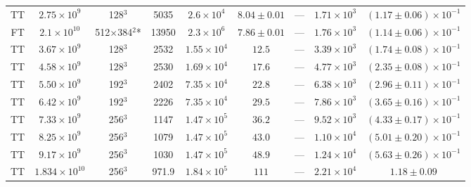 \documentclass[aps, pre, onecolumn, nofootinbib, notitlepage, groupedaddress, amsfonts, amssymb, amsmath, longbibliography, superscriptaddress]{revtex4-1}
\begin{document}
\begin{table}[ht]
\begin{center}
{\begin{tabular}{c c c c c c c c c}
TT	&	$2.75 \times 10^9$		&	128$^3$				&	5035		&	$2.6 \times 10^4$	&	$8.04 \pm 0.01$	&	---		&	$1.71 \times 10^3$  & $(1.17 \pm 0.06) \times 10^{-1}$ \\
FT	&	$2.1 \times 10^{10}$	&	512$\times$384$^2$*	&	13950		&	$2.3 \times 10^6$	&	$7.86 \pm 0.01$	&	---		&	$1.76 \times 10^3$  & $(1.14 \pm 0.06) \times 10^{-1}$ \\
TT	&	$3.67 \times 10^9$		&	128$^3$				&	2532		&	$1.55 \times 10^4$	&	$12.5$			&	---		&	$3.39 \times 10^3$  & $(1.74 \pm 0.08) \times 10^{-1}$ \\
TT	&	$4.58 \times 10^9$		&	128$^3$				&	2530		&	$1.69 \times 10^4$	&	$17.6$			&	---		&	$4.77 \times 10^3$  & $(2.35 \pm 0.08) \times 10^{-1}$ \\
TT	&	$5.50 \times 10^9$		&	192$^3$				&	2402		&	$7.35 \times 10^4$	&	$22.8$			&	---		&	$6.38 \times 10^3$  & $(2.96 \pm 0.11) \times 10^{-1}$ \\
TT	&	$6.42 \times 10^9$		&	192$^3$				&	2226		&	$7.35 \times 10^4$	&	$29.5$			&	---		&	$7.86 \times 10^3$  & $(3.65 \pm 0.16) \times 10^{-1}$ \\
TT	&	$7.33 \times 10^9$		&	256$^3$				&	1147		&	$1.47 \times 10^5$	&	$36.2$			&	---		&	$9.52 \times 10^3$  & $(4.33 \pm 0.17) \times 10^{-1}$ \\
TT	&	$8.25 \times 10^9$		&	256$^3$				&	1079		&	$1.47 \times 10^5$	&	$43.0$			&	---		&	$1.10 \times 10^4$  & $(5.01 \pm 0.20) \times 10^{-1}$ \\
TT	&	$9.17 \times 10^9$		&	256$^3$				&	1030		&	$1.47 \times 10^5$	&	$48.9$			&	---		&	$1.24 \times 10^4$  & $(5.63 \pm 0.26) \times 10^{-1}$ \\
TT	&	$1.834 \times 10^{10}$	&	256$^3$				&	971.9		&	$1.84 \times 10^5$	&	$111$			&	---		&	$2.21 \times 10^4$  & $1.18 \pm 0.09$ \\
\hline																	
\end{tabular}
}
\end{center}
\end{table}
\end{document}
